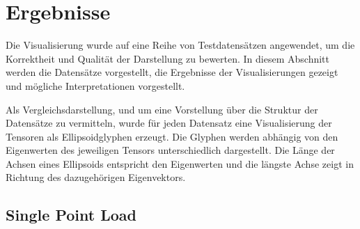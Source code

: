 \documentclass[a4paper,fontsize=12pt,toc=bib,halfparskip]{scrartcl}
\begin{document}
\section{Ergebnisse}
\label{sec:Ergebnisse}
Die Visualisierung wurde auf eine Reihe von Testdatens\"atzen angewendet, um die Korrektheit und Qualit\"at der Darstellung zu bewerten. In diesem Abschnitt werden die Datens\"atze vorgestellt, die Ergebnisse der Visualisierungen gezeigt und m\"ogliche Interpretationen vorgestellt.

Als Vergleichsdarstellung, und um eine Vorstellung \"uber die Struktur der Datens\"atze zu vermitteln, wurde f\"ur jeden Datensatz eine Visualisierung der Tensoren als Ellipsoidglyphen erzeugt. Die Glyphen werden abh\"angig von den Eigenwerten des jeweiligen Tensors unterschiedlich dargestellt. Die L\"ange der Achsen eines Ellipsoids entspricht den Eigenwerten und die l\"angste Achse zeigt in Richtung des dazugeh\"origen Eigenvektors.

\subsection{Single Point Load}
\end{document}
